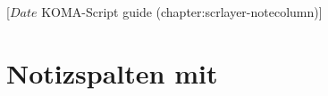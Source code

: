 %
%
%
%
%
%
%
%
% 
%
%
%
%

                 [$Date$
                  KOMA-Script guide (chapter:scrlayer-notecolumn)]

\chapter{Notizspalten mit }

